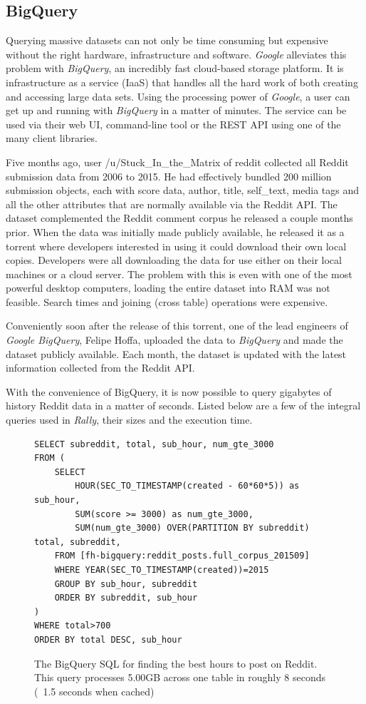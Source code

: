 \documentclass[msc,oneside]{ubcthesis}%
\begin{document}
\subsection{BigQuery}
Querying massive datasets can not only be time consuming but expensive without the right hardware, infrastructure and software. \textit{Google} alleviates this problem with \textit{BigQuery}, an incredibly fast cloud-based storage platform. It is infrastructure as a service (IaaS) that handles all the hard work of both creating and accessing large data sets. Using the processing power of \textit{Google}, a user can get up and running with \textit{BigQuery} in a matter of minutes. The service can be used via their web UI, command-line tool or the REST API using one of the many client libraries. 
\par
Five months ago, user /u/Stuck{\_}In{\_}the{\_}Matrix of reddit collected all Reddit submission data from 2006 to 2015. He had effectively bundled 200 million submission objects, each with score data, author, title, self{\_}text, media tags and all the other attributes that are normally available via the Reddit API. The dataset complemented the Reddit comment corpus he released a couple months prior. When the data was initially made publicly available, he released it as a torrent where developers interested in using it could download their own local copies. Developers were all downloading the data for use either on their local machines or a cloud server. The problem with this is even with one of the most powerful desktop computers, loading the entire dataset into RAM was not feasible. Search times and joining (cross table) operations were expensive. 
\par
Conveniently soon after the release of this torrent, one of the lead engineers of \textit{Google BigQuery}, Felipe Hoffa, uploaded the data to \textit{BigQuery} and made the dataset publicly available. Each month, the dataset is updated with the latest information collected from the Reddit API.
\par
With the convenience of BigQuery, it is now possible to query gigabytes of history Reddit data in a matter of seconds. Listed below are a few of the integral queries used in \textit{Rally}, their sizes and the execution time.

\begin{figure}[!htb]
\begin{lstlisting}
SELECT subreddit, total, sub_hour, num_gte_3000
FROM (
	SELECT
		HOUR(SEC_TO_TIMESTAMP(created - 60*60*5)) as sub_hour,
		SUM(score >= 3000) as num_gte_3000,
		SUM(num_gte_3000) OVER(PARTITION BY subreddit) total, subreddit,
	FROM [fh-bigquery:reddit_posts.full_corpus_201509]
	WHERE YEAR(SEC_TO_TIMESTAMP(created))=2015
	GROUP BY sub_hour, subreddit
	ORDER BY subreddit, sub_hour
)
WHERE total>700
ORDER BY total DESC, sub_hour
\end{lstlisting}
\caption[Query finding the best hours to post on Reddit]{
The BigQuery SQL for finding the best hours to post on Reddit. This query processes 5.00GB across one table in roughly 8 seconds (~1.5 seconds when cached)}
\end{figure}
\end{document}
